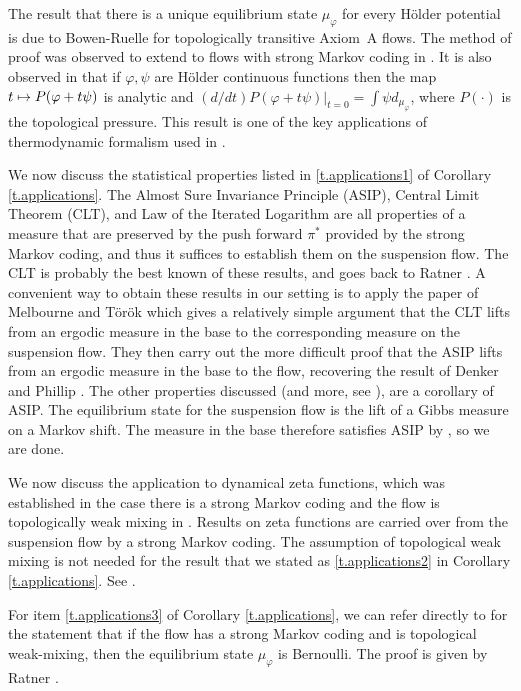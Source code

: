 \documentclass[10pt]{amsart}
\def\mto{\mathchoice{\longmapsto}{\mapsto}{\mapsto}{\mapsto}}
\theoremstyle{definition}
\numberwithin{equation}{section}
\begin{document}
The result that there is a unique equilibrium state $\mu_\varphi$ for every Hölder potential is due to Bowen-Ruelle \cite{bowen-ruelle} for topologically transitive Axiom~A flows. The method of proof was observed to extend to flows with strong Markov coding in \cite{pollicott}. It is also observed in \cite{pollicott} that if $\varphi, \psi$ are Hölder continuous functions then the map $t \mto P(\varphi + t \psi)$ is analytic and $(d/dt)P(\varphi+ t \psi)|_{t=0} = \int \psi d_{\mu_\varphi}$, where $P(\cdot)$ is the topological pressure. This result is one of the key applications of thermodynamic formalism used in \cite{bcls, aS16}.

We now discuss the statistical properties listed in \eqref{t.applications1} of Corollary \ref{t.applications}. The Almost Sure Invariance Principle (ASIP), Central Limit Theorem (CLT), and Law of the Iterated Logarithm are all properties of a measure that are preserved by the push forward $\pi^\ast$ provided by the strong Markov coding, and thus it suffices to establish them on the suspension flow. The CLT is probably the best known of these results, and goes back to Ratner \cite{ratner}.
A convenient way to obtain these results in our setting is to apply the paper of Melbourne and Török \cite{MT04} which gives a relatively simple argument that the CLT lifts from an ergodic measure in the base to the corresponding measure on the suspension flow. They then carry out the more difficult proof that the ASIP lifts from an ergodic measure in the base to the flow, recovering the result of Denker and Phillip \cite{DP84}. The other properties discussed (and more, see \cite{MT04}), are a corollary of ASIP. The equilibrium state for the suspension flow is the lift of a Gibbs measure on a Markov shift. The measure in the base therefore satisfies ASIP by \cite{DP84}, so we are done.

We now discuss the application to dynamical zeta functions, which was established in the case there is a strong Markov coding and the flow is topologically weak mixing in \cite{pollicott}. Results on zeta functions are carried over from the suspension flow by a strong Markov coding. The assumption of topological weak mixing is not needed for the result that we stated as \eqref{t.applications2} in Corollary \ref{t.applications}. See \cite[Chap.\,6]{PP}.

For item \eqref{t.applications3} of Corollary \ref{t.applications}, we can refer directly to \cite{pollicott} for the statement that if the flow has a strong Markov coding and is topological weak-mixing, then the equilibrium state $\mu_\varphi$ is Bernoulli. The proof is given by Ratner \cite{ratner2}.
\end{document}
